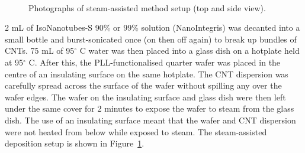 \documentclass[
  letterpaper,
  DIV=11,
  numbers=noendperiod]{scrartcl}
\begin{document}
\begin{figure}

\begin{minipage}[t]{0.47\linewidth}

{\centering 


}

\end{minipage}%
%
\begin{minipage}[t]{0.05\linewidth}

{\centering 

~

}

\end{minipage}%
%
\begin{minipage}[t]{0.47\linewidth}

{\centering 


}

\end{minipage}%

\caption{\label{fig-steaming-method}Photographs of steam-assisted method
setup (top and side view).}

\end{figure}

2 mL of IsoNanotubes-S 90\% or 99\% solution (NanoIntegris) was decanted
into a small bottle and burst-sonicated once (on then off again) to
break up bundles of CNTs. 75 mL of 95\(^\circ\) C water was then placed
into a glass dish on a hotplate held at 95\(^\circ\) C. After this, the
PLL-functionalised quarter wafer was placed in the centre of an
insulating surface on the same hotplate. The CNT dispersion was
carefully spread across the surface of the wafer without spilling any
over the wafer edges. The wafer on the insulating surface and glass dish
were then left under the same cover for 2 minutes to expose the wafer to
steam from the glass dish. The use of an insulating surface meant that
the wafer and CNT dispersion were not heated from below while exposed to
steam. The steam-assisted deposition setup is shown in
Figure~\ref{fig-steaming-method}.
\end{document}
